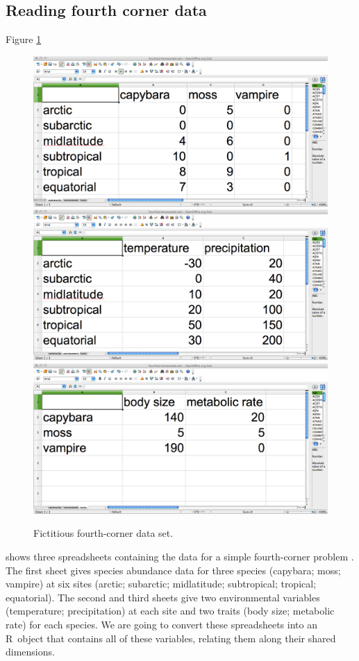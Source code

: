 \documentclass{article}
\newcommand{\R}{{\sf R}}
\numberwithin{exercise}{section}
\begin{document}
\subsection{Reading fourth corner data}

Figure \ref{fig:spreadsheetfc} \begin{figure}
\includegraphics{./readingmultipletables/community.png}
\includegraphics{./readingmultipletables/environment.png}
\includegraphics{./readingmultipletables/traits.png}
\caption{Fictitious fourth-corner data set.}
\label{fig:spreadsheetfc}
\end{figure}shows three spreadsheets containing the data for a simple fourth-corner problem \citep{LegendreEtAl1997}.  The first sheet gives species abundance data for three species (capybara; moss; vampire) at six sites (arctic; subarctic; midlatitude; subtropical; tropical; equatorial).  The second and third sheets give two environmental variables (temperature; precipitation) at each site and two traits (body size; metabolic rate) for each species.  We are going to convert these spreadsheets into an \R\ object that contains all of these variables, relating them along their shared dimensions.
\end{document}
